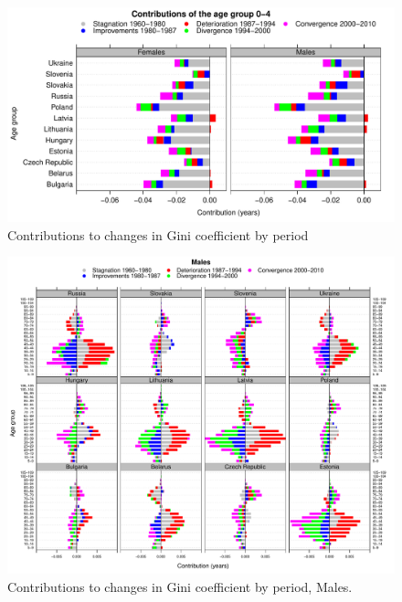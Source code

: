 \documentclass{article}
\begin{document}
\newpage

\begin{figure}[h!]
\caption{Contributions to changes in Gini coefficient by period}
\centering
\begin{center}
\includegraphics[scale=.6]{Figures/F6_SS_MalesInfant_Periods}
\end{center}
\end{figure}

\newpage

\begin{figure}[h!]
\caption{Contributions to changes in Gini coefficient by period, Males.}
\centering
\begin{center}
\includegraphics[scale=.54]{Figures/F4_SS_MalesDecomp_Periods}
\end{center}

\end{figure}



\newpage

 


%
\end{document}

